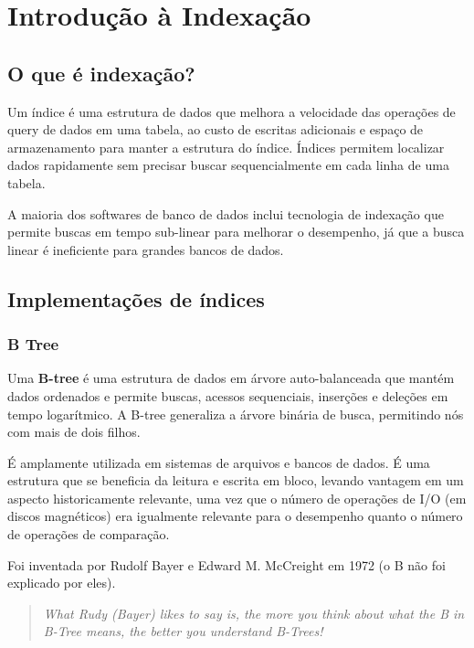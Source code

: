 \chapter{Introdução à Indexação}

\section{O que é indexação?}

Um índice é uma estrutura de dados que melhora a velocidade das operações de query de dados em uma tabela, ao custo de escritas adicionais e espaço de armazenamento para manter a estrutura do índice. Índices permitem localizar dados rapidamente sem precisar buscar sequencialmente em cada linha de uma tabela.

A maioria dos softwares de banco de dados inclui tecnologia de indexação que permite buscas em tempo sub-linear para melhorar o desempenho, já que a busca linear é ineficiente para grandes bancos de dados.

\cite{databaseindex:wiki}

\section{Implementações de índices}

\subsection{B Tree}

Uma \textbf{B-tree} é uma estrutura de dados em árvore auto-balanceada que mantém dados ordenados e permite buscas, acessos sequenciais, inserções e deleções em tempo logarítmico. A B-tree generaliza a árvore binária de busca, permitindo nós com mais de dois filhos.

É amplamente utilizada em sistemas de arquivos e bancos de dados. É uma estrutura que se beneficia da leitura e escrita em bloco, levando vantagem em um aspecto historicamente relevante, uma vez que o número de operações de I/O (em discos magnéticos) era igualmente relevante para o desempenho quanto o número de operações de comparação.

Foi inventada por Rudolf Bayer e Edward M. McCreight em 1972 \cite{btree:bayer1970} (o B não foi explicado por eles).

\begin{quotation}
    \it What Rudy (Bayer) likes to say is, the more you think about what the B in B-Tree means, the better you understand B-Trees!
\end{quotation}

